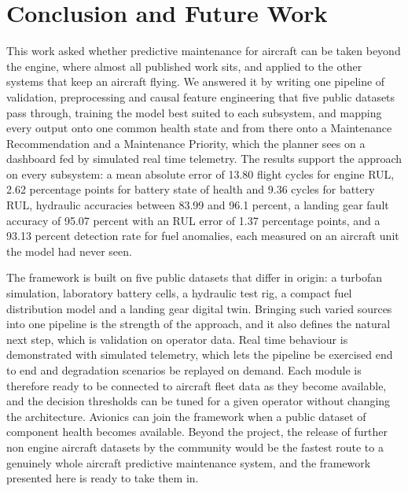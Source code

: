 \documentclass[conference]{IEEEtran}
\begin{document}
\section{Conclusion and Future Work}
This work asked whether predictive maintenance for aircraft can be taken beyond the engine, where almost all published work sits, and applied to the other systems that keep an aircraft flying. We answered it by writing one pipeline of validation, preprocessing and causal feature engineering that five public datasets pass through, training the model best suited to each subsystem, and mapping every output onto one common health state and from there onto a Maintenance Recommendation and a Maintenance Priority, which the planner sees on a dashboard fed by simulated real time telemetry. The results support the approach on every subsystem: a mean absolute error of 13.80 flight cycles for engine RUL, 2.62 percentage points for battery state of health and 9.36 cycles for battery RUL, hydraulic accuracies between 83.99 and 96.1 percent, a landing gear fault accuracy of 95.07 percent with an RUL error of 1.37 percentage points, and a 93.13 percent detection rate for fuel anomalies, each measured on an aircraft unit the model had never seen.

The framework is built on five public datasets that differ in origin: a turbofan simulation, laboratory battery cells, a hydraulic test rig, a compact fuel distribution model and a landing gear digital twin. Bringing such varied sources into one pipeline is the strength of the approach, and it also defines the natural next step, which is validation on operator data. Real time behaviour is demonstrated with simulated telemetry, which lets the pipeline be exercised end to end and degradation scenarios be replayed on demand. Each module is therefore ready to be connected to aircraft fleet data as they become available, and the decision thresholds can be tuned for a given operator without changing the architecture. Avionics can join the framework when a public dataset of component health becomes available. Beyond the project, the release of further non engine aircraft datasets by the community would be the fastest route to a genuinely whole aircraft predictive maintenance system, and the framework presented here is ready to take them in.
\end{document}
